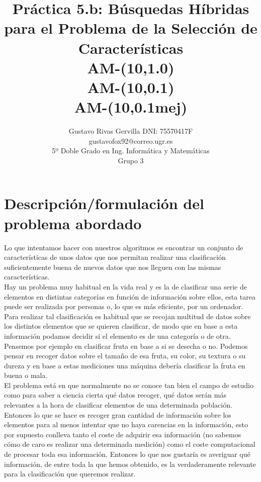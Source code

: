\documentclass[10pt,a4paper]{article}
\author{Gustavo Rivas Gervilla DNI: 75570417F \\ gustavofox92@correo.ugr.es \\5º Doble Grado en Ing. Informática y Matemáticas \\Grupo 3}
\title{Práctica 5.b: Búsquedas Híbridas para el Problema de la Selección de Características \\ AM-(10,1.0) \\ AM-(10,0.1) \\ AM-(10,0.1mej)}
\date{}
\begin{document}
\lstset{language=Python, style=customPy}
\maketitle

\newpage

\tableofcontents

\newpage

\section{\color[rgb]{0.0,0.0,0.21}Descripción/formulación del problema abordado}
Lo que intentamos hacer con nuestros algoritmos es encontrar un conjunto de características de unos datos que nos permitan realizar una clasificación suficientemente buena de nuevos datos que nos lleguen con las mismas características.\\

Hay un problema muy habitual en la vida real y es la de clasificar una serie de elementos en distintas categorías en función de información sobre ellos, esta tarea puede ser realizada por personas o, lo que es más eficiente, por un ordenador. Para realizar tal clasificación es habitual que se recojan multitud de datos sobre los distintos elementos que se quieren clasificar, de modo que en base a esta información podamos decidir si el elemento es de una categoría o de otra. Pensemos por ejemplo en clasificar fruta en base a si se desecha o no. Podemos pensar en recoger datos sobre el tamaño de esa fruta, su color, su textura o su dureza y en base a estas mediciones una máquina debería clasificar la fruta en buena o mala.\\

El problema está en que normalmente no se conoce tan bien el campo de estudio como para saber a ciencia cierta qué datos recoger, qué datos serán más relevantes a la hora de clasificar elementos de una determinada población. Entonces lo que se hace es recoger gran cantidad de información sobre los elementos para al menos intentar que no haya carencias en la información, esto por supuesto conlleva tanto el coste de adquirir esa información (no sabemos cómo de caro es realizar una determinada medición) como el coste computacional de procesar toda esa información. Entonces lo que nos gustaría es averiguar qué información, de entre toda la que hemos obtenido, es la verdaderamente relevante para la clasificación que queremos realizar.\\
\end{document}
